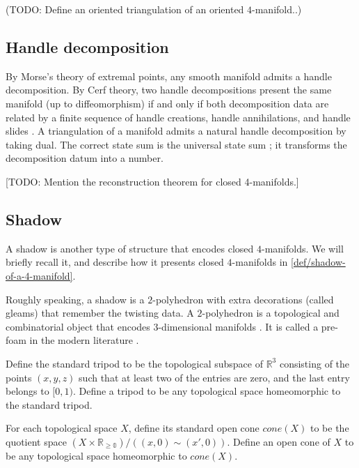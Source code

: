 (TODO: Define an oriented triangulation of an oriented
$4$-manifold..)

\subsection{Handle decomposition}

\noindent By Morse's theory of extremal points, any smooth
manifold admits a handle decomposition. By Cerf theory, two
handle decompositions present the same manifold (up to
diffeomorphism) if and only if both decomposition data are
related by a finite sequence of handle creations, handle
annihilations, and handle slides \cite{?}. A triangulation of a
manifold admits a natural handle decomposition by taking dual.
The correct state sum is the universal state sum \cite{?}; it
transforms the decomposition datum into a number.

[TODO: Mention the reconstruction theorem for closed
4-manifolds.]

\subsection{Shadow}


\noindent A shadow is another type of structure that encodes
closed $4$-manifolds. We will briefly recall it, and describe how
it presents closed $4$-manifolds in
\ref{def/shadow-of-a-4-manifold}.

\noindent Roughly speaking, a shadow is a $2$-polyhedron with
extra decorations (called gleams) that remember the twisting
data. A $2$-polyhedron is a topological and combinatorial object
that encodes $3$-dimensional manifolds \cite{?Matveev}. It is
called a pre-foam in the modern literature
\cite{khovanov-robert/foam}.

\begin{definition}[tripod]\label{def/tripod}
  Define the standard tripod to be the topological subspace of
  $\mathbb{R}^{3}$ consisting of the points $(x,y,z)$ such that
  at least two of the entries are zero, and the last entry
  belongs to $[0,1)$. Define a tripod to be any topological space
  homeomorphic to the standard tripod.
\end{definition}

\begin{definition}[cone]\label{def/cone}
  For each topological space $X$, define its standard open cone
  $cone(X)$ to be the quotient space
  $(X \times \mathbb{R_{\geq 0}})/((x,0) \sim (x',0)).$ Define an
  open cone of $X$ to be any topological space homeomorphic to
  $cone(X)$.
\end{definition}

